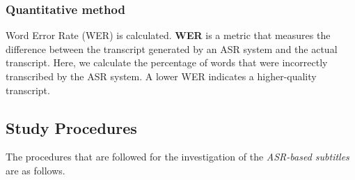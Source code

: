 \documentclass[english]{textolivre}
\begin{document}
\subsubsection{Quantitative method}\label{subsubsec-Quatitative-method}

Word Error Rate (WER) is calculated. \textbf{WER} is a metric that
measures the difference between the transcript generated by an ASR
system and the actual transcript. Here, we calculate the percentage of
words that were incorrectly transcribed by the ASR system. A lower WER
indicates a higher-quality transcript.


\subsection{Study Procedures}\label{subsec-Study-Procedures}

The procedures that are followed for the investigation of the
\emph{ASR-based subtitles} are as follows.
\end{document}
